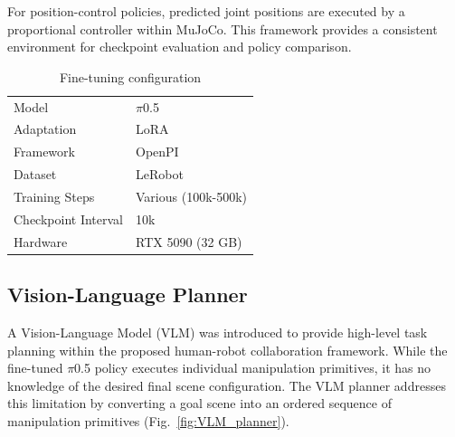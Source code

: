 \documentclass[conference, 12pt]{IEEEtran}
\begin{document}
For position-control policies, predicted joint positions are executed by a proportional controller within MuJoCo. This framework provides a consistent environment for checkpoint evaluation and policy comparison.

\begin{table}[h]
\centering
\caption{Fine-tuning configuration}
\label{tab:finetune_config}
\small
\begin{tabular}{ll}
\hline
Model & $\pi$0.5 \\
Adaptation & LoRA \\
Framework & OpenPI \\
Dataset & LeRobot \\
Training Steps & Various (100k-500k)\\
Checkpoint Interval & 10k \\
Hardware & RTX 5090 (32 GB) \\
\hline
\end{tabular}
\end{table}






\subsection{Vision-Language Planner}

A Vision-Language Model (VLM) was introduced to provide high-level task planning within the proposed human-robot collaboration framework. While the fine-tuned $\pi$0.5 policy executes individual manipulation primitives, it has no knowledge of the desired final scene configuration. The VLM planner addresses this limitation by converting a goal scene into an ordered sequence of manipulation primitives (Fig.~\ref{fig:VLM_planner}).
\end{document}
